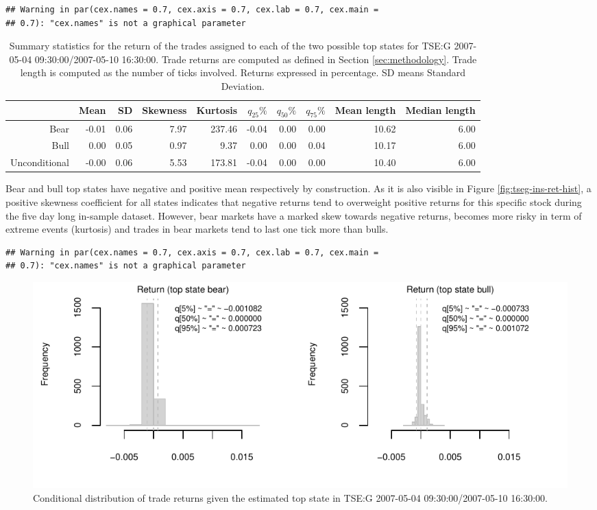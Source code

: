 \documentclass[]{article}
\begin{document}
\begin{verbatim}
## Warning in par(cex.names = 0.7, cex.axis = 0.7, cex.lab = 0.7, cex.main =
## 0.7): "cex.names" is not a graphical parameter
\end{verbatim}

\begin{table}[ht]
\centering
\begingroup\footnotesize
\begin{tabularx}{\textwidth}{rRRRRRRRRR}
  \toprule
 & Mean & SD & Skewness & Kurtosis & $q_{25}\%$ & $q_{50}\%$ & $q_{75}\%$ & Mean length & Median length \\ 
  \midrule
Bear & -0.01 & 0.06 & 7.97 & 237.46 & -0.04 & 0.00 & 0.00 & 10.62 & 6.00 \\ 
  Bull & 0.00 & 0.05 & 0.97 & 9.37 & 0.00 & 0.00 & 0.04 & 10.17 & 6.00 \\ 
  Unconditional & -0.00 & 0.06 & 5.53 & 173.81 & -0.04 & 0.00 & 0.00 & 10.40 & 6.00 \\ 
   \bottomrule
\end{tabularx}
\endgroup
\caption{Summary statistics for the return of the trades 
               assigned to each of the two possible top states for 
               TSE:G 2007-05-04 09:30:00/2007-05-10 16:30:00. Trade returns 
               are computed as defined in Section \ref{sec:methodology}. 
               Trade length is computed as the number of ticks involved.
               Returns expressed in percentage. SD means Standard Deviation.} 
\label{tab:tseg-ins-topstate}
\end{table}

Bear and bull top states have negative and positive mean respectively by
construction. As it is also visible in Figure
\ref{fig:tseg-ins-ret-hist}, a positive skewness coefficient for all
states indicates that negative returns tend to overweight positive
returns for this specific stock during the five day long in-sample
dataset. However, bear markets have a marked skew towards negative
returns, becomes more risky in term of extreme events (kurtosis) and
trades in bear markets tend to last one tick more than bulls.

\begin{verbatim}
## Warning in par(cex.names = 0.7, cex.axis = 0.7, cex.lab = 0.7, cex.main =
## 0.7): "cex.names" is not a graphical parameter
\end{verbatim}

\begin{figure}[H]
\includegraphics[width=\textwidth]{main_files/figure-latex/unnamed-chunk-16-1} \caption{Conditional distribution of trade returns given the estimated top state in TSE:G 2007-05-04 09:30:00/2007-05-10 16:30:00. \label{fig:tseg-ins-ret-hist}}\label{fig:unnamed-chunk-16}
\end{figure}
\end{document}
